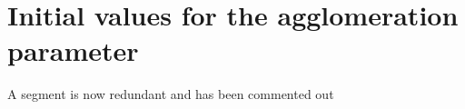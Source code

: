 





\section{Initial values for  the agglomeration parameter}
A segment is now redundant and has been commented out











